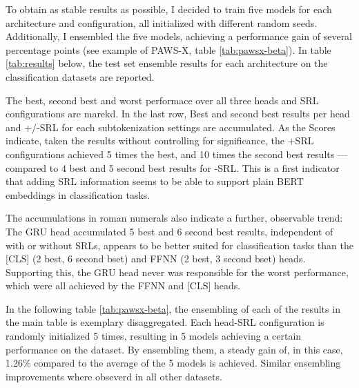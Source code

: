 To obtain as stable results as possible, I decided to train five models for each architecture
and configuration, all initialized with different random seeds. Additionally, I ensembled the
five models, achieving a performance gain of several percentage points (see example of PAWS-X,
table \ref{tab:pawsx-beta}). In table \ref{tab:results} below, the test set ensemble results for
each architecture on the classification datasets are reported.

The best, second best and worst performace over all three heads and SRL configurations
are marekd. In the last row, Best and second best results per head and +/-SRL for each
subtokenization settings are accumulated. As the Scores indicate, taken the results without
controlling for significance, the +SRL configurations
achieved 5 times the best, and 10 times the second best results --- compared to 4 best and
5 second best results for -SRL. This is a first indicator that adding SRL information seems
to be able to support plain BERT embeddings in classification tasks.

The accumulations in roman numerals also indicate a further, observable trend: The GRU head
accumulated 5 best and 6 second best results, independent of with or without SRLs, appears to be better
suited for classification tasks than the [CLS] (2 best, 6 second bset) and FFNN (2 best, 3 second bset) heads.
Supporting this, the GRU head never was responsible for the worst performance, which were all
achieved by the FFNN and [CLS] heads.

In the following table \ref{tab:pawsx-beta}, the ensembling of each of the results in the main table is
exemplary disaggregated. Each head-SRL configuration is randomly initialized 5 times, resulting in
5 models achieving a certain performance on the dataset. By ensembling them, a steady gain of, in this case,
1.26\% compared to the average of the 5 models is achieved. Similar ensembling improvements where
obseverd in all other datasets.


